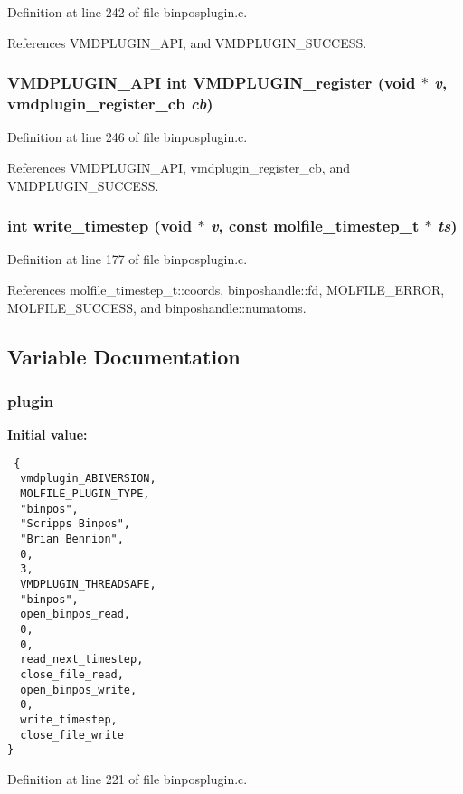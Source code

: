 Definition at line 242 of file binposplugin.c.

References VMDPLUGIN\_\-API, and VMDPLUGIN\_\-SUCCESS.
\subsubsection{\setlength{\rightskip}{0pt plus 5cm}VMDPLUGIN\_\-API int VMDPLUGIN\_\-register (void $\ast$ {\em v}, {\bf vmdplugin\_\-register\_\-cb} {\em cb})}\label{binposplugin_8c_a8}




Definition at line 246 of file binposplugin.c.

References VMDPLUGIN\_\-API, vmdplugin\_\-register\_\-cb, and VMDPLUGIN\_\-SUCCESS.
\subsubsection{\setlength{\rightskip}{0pt plus 5cm}int write\_\-timestep (void $\ast$ {\em v}, const {\bf molfile\_\-timestep\_\-t} $\ast$ {\em ts})\hspace{0.3cm}{\tt  [static]}}\label{binposplugin_8c_a5}




Definition at line 177 of file binposplugin.c.

References molfile\_\-timestep\_\-t::coords, binposhandle::fd, MOLFILE\_\-ERROR, MOLFILE\_\-SUCCESS, and binposhandle::numatoms.

\subsection{Variable Documentation}
\subsubsection{ plugin\hspace{0.3cm}{\tt  [static]}}\label{binposplugin_8c_a0}


{\bf Initial value:}

\footnotesize\begin{verbatim} {
  vmdplugin_ABIVERSION,         
  MOLFILE_PLUGIN_TYPE,          
  "binpos",                     
  "Scripps Binpos",             
  "Brian Bennion",              
  0,                            
  3,                            
  VMDPLUGIN_THREADSAFE,         
  "binpos",                     
  open_binpos_read,
  0,
  0,
  read_next_timestep,
  close_file_read,
  open_binpos_write,
  0,
  write_timestep,
  close_file_write
}\end{verbatim}\normalsize 


Definition at line 221 of file binposplugin.c.